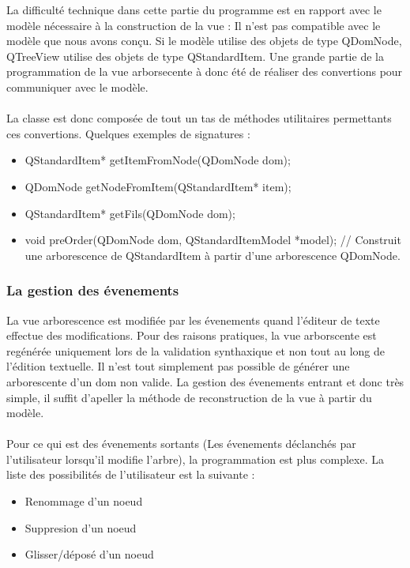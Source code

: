 La difficulté technique dans cette partie du programme est en rapport avec le modèle nécessaire à la construction de la vue :
Il n'est pas compatible avec le modèle que nous avons conçu. Si le modèle utilise des objets de type QDomNode, QTreeView utilise des objets de type QStandardItem. Une grande partie de la programmation de la vue arborsecente à donc été de réaliser des convertions pour communiquer avec le modèle.
\paragraph{}

La classe est donc composée de tout un tas de méthodes utilitaires permettants ces convertions. Quelques exemples de signatures :
\begin{itemize}
\item QStandardItem* getItemFromNode(QDomNode dom);
\item QDomNode getNodeFromItem(QStandardItem* item);
\item QStandardItem* getFils(QDomNode dom);
\item void preOrder(QDomNode dom, QStandardItemModel *model); // Construit une arborescence de QStandardItem à partir d'une arborescence QDomNode.
\end{itemize}


\subsubsection{La gestion des évenements}

La vue arborescence est modifiée par les évenements quand l'éditeur de texte effectue des modifications.
Pour des raisons pratiques, la vue arborscente est regénérée uniquement lors de la validation synthaxique et non tout au long de
l'édition textuelle. Il n'est tout simplement pas possible de générer une arborescente d'un dom non valide.
La gestion des évenements entrant et donc très simple, il suffit d'apeller la méthode de reconstruction de la vue à partir du modèle.
\paragraph{}

Pour ce qui est des évenements sortants (Les évenements déclanchés par l'utilisateur lorsqu'il modifie l'arbre), la programmation
est plus complexe. La liste des possibilités de l'utilisateur est la suivante :

\begin{itemize}
\item Renommage d'un noeud
\item Suppresion d'un noeud
\item Glisser/déposé d'un noeud
\end{itemize}


